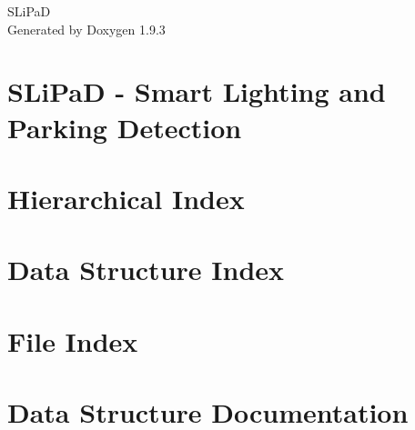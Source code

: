 \documentclass[twoside]{book}
\newcommand{\+}{\discretionary{\mbox{\scriptsize$\hookleftarrow$}}{}{}}
\newcommand{\clearemptydoublepage}{%
    \newpage{\pagestyle{empty}\cleardoublepage}%
  }
\begin{document}
  \raggedbottom
    \hypersetup{pageanchor=false,
                bookmarksnumbered=true,
                pdfencoding=unicode
               }
  \begin{titlepage}
  \vspace*{7cm}
  \begin{center}%
  {\Large SLi\+PaD}\\
  \vspace*{1cm}
  {\large Generated by Doxygen 1.9.3}\\
  \end{center}
  \end{titlepage}
  \clearemptydoublepage
  \tableofcontents
  \clearemptydoublepage
  \hypersetup{pageanchor=true}
\chapter{SLi\+PaD -\/ Smart Lighting and Parking Detection}
\label{md__r_e_a_d_m_e}

\chapter{Hierarchical Index}

\chapter{Data Structure Index}

\chapter{File Index}

\chapter{Data Structure Documentation}
























\end{document}
